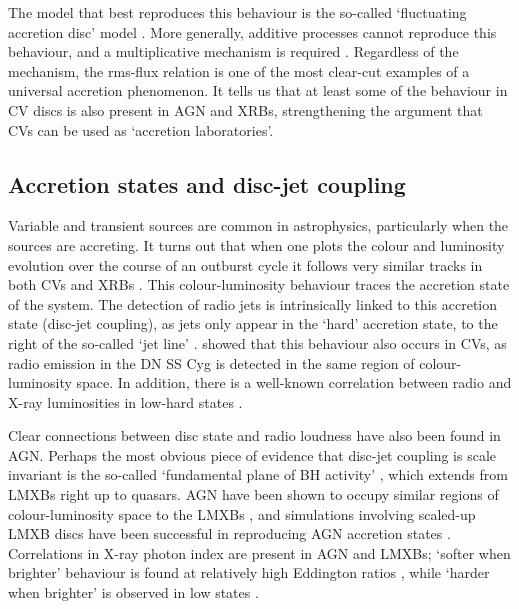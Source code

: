 The model that best reproduces this behaviour is the so-called
`fluctuating accretion disc' model \citep{lyubarskii1997,kotov2001,
arevalo2006,hogg2015}. More generally,
additive processes cannot reproduce this behaviour, and a multiplicative
mechanism is required \citep{uttley2005}. 
Regardless of the mechanism, the rms-flux relation is one of the most
clear-cut examples of a universal accretion phenomenon. 
It tells us that at least some of the behaviour in CV discs
is also present in AGN and XRBs, strengthening the argument that CVs
can be used as `accretion laboratories'. 


\subsection{Accretion states and disc-jet coupling}
\label{sec:disc-jet}

Variable and transient sources are common in astrophysics, particularly
when the sources are accreting. It turns out that when one plots
the colour and luminosity evolution over the course of an outburst cycle 
it follows very similar tracks in both CVs and XRBs
\citep[see Fig.~\ref{fig:kording_hid}, ][]{kordingDNjet2008}.
This colour-luminosity behaviour traces the accretion state of the system. 
The detection of radio jets is intrinsically linked to this accretion state
(disc-jet coupling), as jets only appear in the `hard' accretion 
state, to the right of the so-called `jet line' \citep{fender2001,fender2004}.
\cite{kordingDNjet2008} showed that this behaviour also occurs in CVs, 
as radio emission in the DN SS Cyg is detected in the same region 
of colour-luminosity space. In addition, there is a well-known correlation between 
radio and X-ray luminosities in low-hard states \citep{gallo2003}.

Clear connections between disc state and radio loudness have also been
found in AGN. Perhaps the most obvious piece of evidence that disc-jet coupling
is scale invariant is the so-called `fundamental plane of BH activity' 
\citep{merloni2003}, which extends from LMXBs right up to quasars. 
AGN have been shown to occupy similar regions of colour-luminosity
space to the LMXBs \citep{kording2006}, and simulations involving
scaled-up LMXB discs have been successful in reproducing AGN accretion states
\citep{sobolewska2011}. Correlations
in X-ray photon index are present in AGN and LMXBs;
`softer when brighter' behaviour is found 
at relatively high Eddington ratios \citep{mchardy1999,gu2009},
while `harder when brighter' is observed in 
low states \citep{gu2009,dimitri_llagn,connolly2016}.

